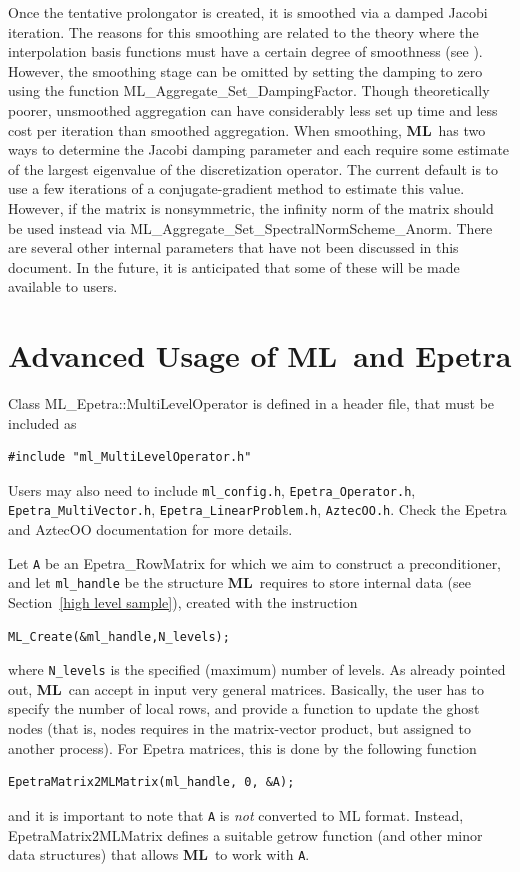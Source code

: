 \documentclass{article}[11pt]
\newcommand{\ML}     {{\bf ML}}
\begin{document}
Once the tentative prolongator is created, it is smoothed via a damped Jacobi
iteration. The reasons for this smoothing are related to the theory where the
interpolation basis functions must have a certain degree of smoothness (see \cite{vanek4}).
However, the smoothing stage can be omitted by setting the damping to zero
using the function 
{\sf ML\_Aggregate\_Set\_DampingFactor}. Though
theoretically poorer, unsmoothed aggregation can have considerably less set up
time and less cost per iteration than smoothed aggregation.
When smoothing,
\ML\ has two ways to determine the Jacobi damping parameter and each require some estimate
of the largest eigenvalue of the discretization operator. The current default is to
use a few iterations of a conjugate-gradient method to estimate this value.
However, if the matrix is nonsymmetric, the infinity norm of the matrix should be used 
instead via {\sf ML\_Aggregate\_Set\_SpectralNormScheme\_Anorm}.  
There are several other internal parameters that have not 
been discussed in this document. In the future, it is anticipated that some of 
these will be made available to users.


%
\section{Advanced Usage of \ML\ and Epetra}
\label{sec:advanced}
%
Class ML\_Epetra::MultiLevelOperator is defined in a header file, that must
be included as
\begin{verbatim}
#include "ml_MultiLevelOperator.h" 
\end{verbatim}
Users may also need to include \verb!ml_config.h!,
\verb!Epetra_Operator.h!, \verb!Epetra_MultiVector.h!,
\verb!Epetra_LinearProblem.h!,  \verb!AztecOO.h!. Check the {\sc Epetra} and
AztecOO documentation for more details.

Let \verb!A! be an Epetra\_RowMatrix for which we aim to construct
a preconditioner, and let \verb!ml_handle! be the structure \ML\ requires
to store internal data (see Section~\ref{high level sample}), created
with the instruction
\begin{verbatim}
ML_Create(&ml_handle,N_levels);
\end{verbatim}
where \verb!N_levels! is the specified (maximum) number of levels.  As
already pointed out, \ML\ can accept in input very general matrices.
Basically, the user has to specify the number of local rows, and provide
a function to update the ghost nodes (that is, nodes requires in the
matrix-vector product, but assigned to another process). For Epetra
matrices, this is done by the following function
\begin{verbatim}
EpetraMatrix2MLMatrix(ml_handle, 0, &A);
\end{verbatim}
and it is important to note that \verb!A! is {\sl not} converted to ML
format. Instead, {\sf EpetraMatrix2MLMatrix} defines a suitable getrow
function (and other minor data structures) that allows \ML\ to work with
\verb!A!.
\end{document}

